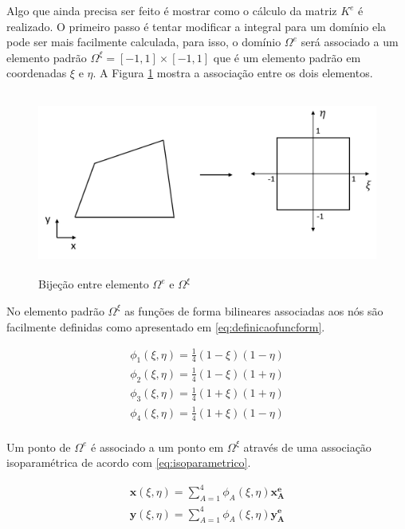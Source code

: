 Algo que ainda precisa ser feito é mostrar como o cálculo da matriz $K^e$ é realizado. O primeiro passo é tentar modificar a integral para um domínio ela pode ser mais facilmente calculada, para isso, o domínio $\Omega^e$ será associado a um elemento padrão  $\Omega^\xi = [-1,1]\times[-1,1]$ que é um elemento padrão em coordenadas $\xi$ e $\eta$. A Figura \ref{fig:bijecaoelemento} mostra a associação entre os dois elementos.


\begin{figure}[!htbp]
\centering
\includegraphics[height=6cm]{chap01/figs/elementopadrao.png}
\caption{Bijeção entre elemento $\Omega^e$ e $\Omega^\xi$}
\label{fig:bijecaoelemento}
\end{figure}


No elemento padrão $\Omega^\xi$ as funções de forma bilineares associadas aos nós são facilmente definidas como apresentado em \eqref{eq:definicaofuncform}. 


\begin{equation}
\begin{matrix}\label{eq:definicaofuncform}
\phi_1(\xi, \eta) = \frac{1}{4} (1-\xi)(1-\eta) \\
\phi_2(\xi, \eta) = \frac{1}{4} (1-\xi)(1+\eta) \\
\phi_3(\xi, \eta) = \frac{1}{4} (1+\xi)(1+\eta) \\
\phi_4(\xi, \eta) = \frac{1}{4} (1+\xi)(1-\eta) \\
\end{matrix}
\end{equation}


Um ponto de $\Omega^e$ é associado a um ponto em $\Omega^\xi$ através de uma associação isoparamétrica de acordo com \eqref{eq:isoparametrico}. 


\begin{equation}\label{eq:isoparametrico}
\begin{matrix}
\mathbf{x}(\xi, \eta) = \sum_{A=1}^{4} \phi_A(\xi, \eta) \mathbf{x^e_A} \\
\mathbf{y}(\xi, \eta) = \sum_{A=1}^{4} \phi_A(\xi, \eta) \mathbf{y^e_A} 
\end{matrix}
\end{equation}


